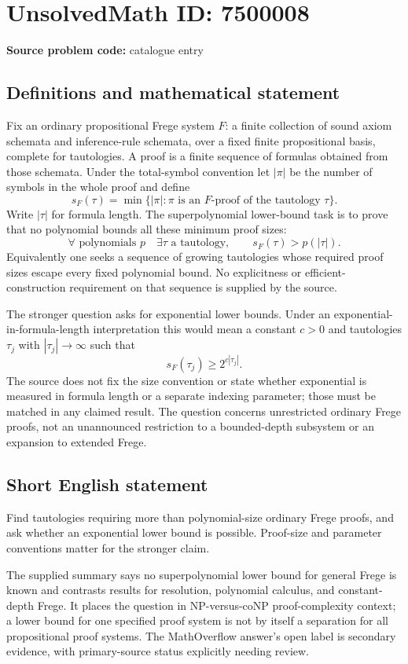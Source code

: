 \documentclass[11pt]{article}
\begin{document}
\section*{UnsolvedMath ID: 7500008}
\textbf{Source problem code:} catalogue entry
\subsection{Definitions and mathematical statement}
Fix an ordinary propositional Frege system $F$: a finite collection of sound axiom schemata and inference-rule schemata, over a fixed finite propositional basis, complete for tautologies. A proof is a finite sequence of formulas obtained from those schemata. Under the total-symbol convention let $|\pi|$ be the number of symbols in the whole proof and define
\[
 s_F(\tau)=\min\{|\pi|:\pi\text{ is an }F\text{-proof of the tautology }\tau\}.
\]
Write $|\tau|$ for formula length. The superpolynomial lower-bound task is to prove that no polynomial bounds all these minimum proof sizes:
\[
 \forall\text{ polynomials }p\quad\exists\tau\text{ a tautology},
 \qquad s_F(\tau)>p(|\tau|).
\]
Equivalently one seeks a sequence of growing tautologies whose required proof sizes escape every fixed polynomial bound. No explicitness or efficient-construction requirement on that sequence is supplied by the source.

The stronger question asks for exponential lower bounds. Under an exponential-in-formula-length interpretation this would mean a constant $c>0$ and tautologies $\tau_j$ with $|\tau_j|\to\infty$ such that
\[
 s_F(\tau_j)\ge2^{c|\tau_j|}.
\]
The source does not fix the size convention or state whether exponential is measured in formula length or a separate indexing parameter; those must be matched in any claimed result. The question concerns unrestricted ordinary Frege proofs, not an unannounced restriction to a bounded-depth subsystem or an expansion to extended Frege.
\subsection{Short English statement}
Find tautologies requiring more than polynomial-size ordinary Frege proofs, and ask whether an exponential lower bound is possible. Proof-size and parameter conventions matter for the stronger claim.

The supplied summary says no superpolynomial lower bound for general Frege is known and contrasts results for resolution, polynomial calculus, and constant-depth Frege. It places the question in NP-versus-coNP proof-complexity context; a lower bound for one specified proof system is not by itself a separation for all propositional proof systems. The MathOverflow answer's open label is secondary evidence, with primary-source status explicitly needing review.
\end{document}
